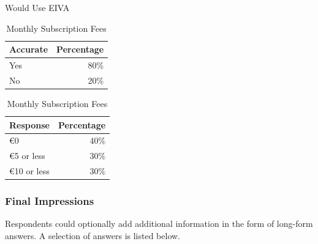 \documentclass{article}
\begin{document}
\begin{table}[!htb]
    \begin{minipage}{.5\linewidth}
   	 \caption{Would Use EIVA}
      \centering
        \begin{tabular}{lr}
	        \hline
            \textbf{Accurate} & \textbf{Percentage} \\
            \hline
            Yes & 80\% \\
            No & 20\% \\
            \hline
        \end{tabular}
    \end{minipage}%
    \hspace{.1cm}
    \begin{minipage}{.5\linewidth}
      \centering
	    \caption{Monthly Subscription Fees}
        \begin{tabular}{lr}
	        \hline
            \textbf{Response} & \textbf{Percentage} \\
            \hline
            €0 & 40\% \\
            €5 or less & 30\% \\
            €10 or less & 30\% \\
            \hline
        \end{tabular}
    \end{minipage} 
\end{table}

\subsubsection{Final Impressions}

Respondents could optionally add additional information in the form of long-form answers. A selection of answers is listed below.
\end{document}
